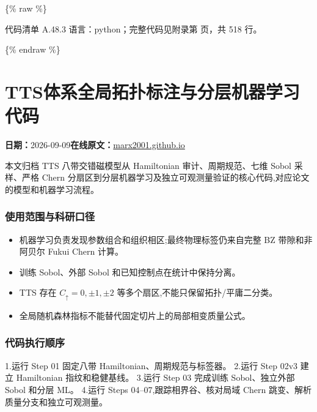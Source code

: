 \documentclass[lang=cn,scheme=chinese,color=blue,device=normal,toc=onecol,math=cm]{elegantbook}
\begin{document}
\{\% raw \%\}\par


\begin{codeindexbox}{代码清单 A.48.3}
语言：python；完整代码见附录第 \pageref{code:48:3} 页，共 518 行。
\end{codeindexbox}


\{\% endraw \%\}\par



\section{TTS体系全局拓扑标注与分层机器学习代码}
\begin{articlemeta}
\textbf{日期：}2026-09-09\hfill\textbf{在线原文：}\href{https://marx2001.github.io/sci-note\_posts/20260909-altermagnetic-tts-global-code/}{marx2001.github.io}
\end{articlemeta}

本文归档 TTS 八带交错磁模型从 Hamiltonian 审计、周期规范、七维 Sobol 采样、严格 Chern 分扇区到分层机器学习及独立可观测量验证的核心代码,对应论文的模型和机器学习流程。\par


\subsubsection{使用范围与科研口径}


\begin{itemize}
\item 机器学习负责发现参数组合和组织相区;最终物理标签仍来自完整 BZ 带隙和非阿贝尔 Fukui Chern 计算。
\item 训练 Sobol、外部 Sobol 和已知控制点在统计中保持分离。
\item TTS 存在 \(C_\uparrow=0,\pm1,\pm2\) 等多个扇区,不能只保留拓扑/\allowbreak{}平庸二分类。
\item 全局随机森林指标不能替代固定切片上的局部相变质量公式。
\end{itemize}


\subsubsection{代码执行顺序}


1.运行 Step 01 固定八带 Hamiltonian、周期规范与标签器。 2.运行 Step 02v3 建立 Hamiltonian 指纹和稳健基线。 3.运行 Step 03 完成训练 Sobol、独立外部 Sobol 和分层 ML。 4.运行 Steps 04–07,跟踪相界谷、核对局域 Chern 跳变、解析质量分支和独立可观测量。\par
\end{document}
